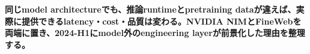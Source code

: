 \noindent\textbf{同じmodel architectureでも、推論runtimeとpretraining dataが違えば、実際に提供できるlatency・cost・品質は変わる。NVIDIA NIMとFineWebを両端に置き、2024-H1にmodel外のengineering layerが前景化した理由を整理する。}\autocite{src-054d1f81750b,src-51631a225b70}
